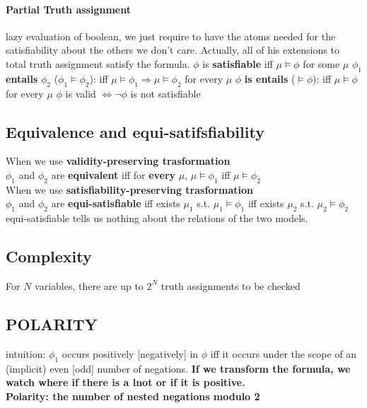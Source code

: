 \documentclass[11pt]{article}
\begin{document}
\paragraph{Partial Truth assignment} %
\label{par:partial_truth_assignment}
lazy evaluation of boolean, we just require to have the atoms needed for the satisfiability about the others we don't care. Actually, all of his extensions to total truth assignment satisfy the formula.
$\phi$ is \textbf{satisfiable} iff $\mu \models \phi$ for some $\mu$
$\phi _1$ \textbf{entails} $\phi _2$ ($\phi _1 \models \phi _2$): iff $\mu \models \phi _1 \Rightarrow \mu \models \phi _2$ for every $\mu$
$\phi$ \textbf{is entails} ($\models \phi$): iff $\mu \models \phi$ for every $\mu$
$\phi$ is valid $\Leftrightarrow \lnot \phi$ is not satisfiable 

\subsection{Equivalence and equi-satifsfiability} %
\label{sub:equivalence_and_equi_satifsfiability}
When we use \textbf{validity-preserving trasformation} \\
$\phi _1 $ and $\phi _2$ are \textbf{equivalent} iff for \textbf{every} $\mu$, $\mu \models \phi _1$ iff $\mu \models \phi _2$ \\

When we use \textbf{satisfiability-preserving trasformation} \\
$\phi _1 $ and $\phi _2$ are \textbf{equi-satisfiable} iff exists $\mu _1$ s.t. $\mu _1 \models \phi _1$ iff exists $\mu _2$ s.t. $\mu _2 \models \phi _2$\\
equi-satisfiable tells us nothing about the relations of the two models. 

\subsection{Complexity} %
\label{sub:complexity}
For $N$ variables, there are up to $2^N$ truth assignments to be checked

\subsection{POLARITY} %
\label{sub:polarity}
intuition: $\phi _1$ occurs positively [negatively] in $\phi$ iff it occurs under
the scope of an (implicit) even [odd] number of negations.
\textbf{If we transform the formula, we watch where if there is a lnot or if it is positive.}\\
\textbf{Polarity: the number of nested negations modulo 2}
\end{document}
